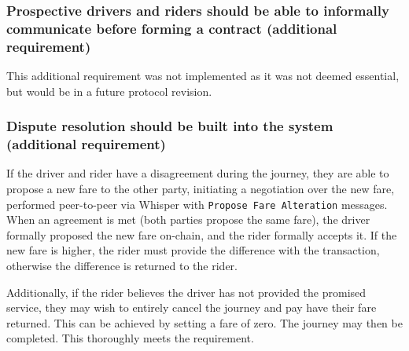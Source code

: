 \subsubsection*{Prospective drivers and riders should be able to informally communicate before forming a contract (additional requirement)}

This additional requirement was not implemented as it was not deemed essential, but would be in a future protocol revision.

\subsubsection*{Dispute resolution should be built into the system (additional requirement)}

If the driver and rider have a disagreement during the journey, they are able to propose a new fare to the other party, initiating a negotiation over the new fare, performed peer-to-peer via Whisper with \lstinline{Propose Fare Alteration} messages. When an agreement is met (both parties propose the same fare), the driver formally proposed the new fare on-chain, and the rider formally accepts it. If the new fare is higher, the rider must provide the difference with the transaction, otherwise the difference is returned to the rider.

Additionally, if the rider believes the driver has not provided the promised service, they may wish to entirely cancel the journey and pay have their fare returned. This can be achieved by setting a fare of zero. The journey may then be completed. This thoroughly meets the requirement.

